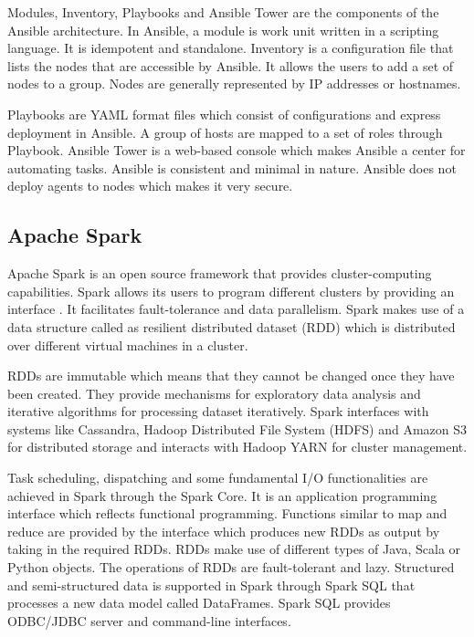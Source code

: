 \documentclass[9pt,twocolumn,twoside]{../../styles/osajnl}
\begin{document}
Modules, Inventory, Playbooks and Ansible Tower are the components of
the Ansible architecture. In Ansible, a module is work unit written in
a scripting language. It is idempotent and standalone. Inventory is a
configuration file that lists the nodes that are accessible by
Ansible. It allows the users to add a set of nodes to a group. Nodes
are generally represented by IP addresses or hostnames.

Playbooks are YAML format files which consist of configurations and
express deployment in Ansible. A group of hosts are mapped to a set of
roles through Playbook. Ansible Tower is a web-based console which
makes Ansible a center for automating tasks. Ansible is consistent and
minimal in nature. Ansible does not deploy agents to nodes which makes
it very secure.

\subsection{Apache Spark}

Apache Spark is an open source framework that provides
cluster-computing capabilities. Spark allows its users to program
different clusters by providing an interface \cite{sparkWiki}. It
facilitates fault-tolerance and data parallelism. Spark makes use of a
data structure called as resilient distributed dataset (RDD) which is
distributed over different virtual machines in a cluster.

RDDs are immutable which means that they cannot be changed once they
have been created. They provide mechanisms for exploratory data
analysis and iterative algorithms for processing dataset
iteratively. Spark interfaces with systems like Cassandra, Hadoop
Distributed File System (HDFS) and Amazon S3 for distributed storage
and interacts with Hadoop YARN for cluster management.

Task scheduling, dispatching and some fundamental I/O functionalities
are achieved in Spark through the Spark Core. It is an application
programming interface which reflects functional programming. Functions
similar to map and reduce are provided by the interface which produces
new RDDs as output by taking in the required RDDs. RDDs make use of
different types of Java, Scala or Python objects. The operations of
RDDs are fault-tolerant and lazy. Structured and semi-structured data
is supported in Spark through Spark SQL that processes a new data
model called DataFrames. Spark SQL provides ODBC/JDBC server and
command-line interfaces.
\end{document}
